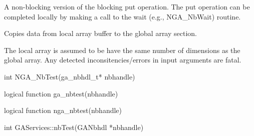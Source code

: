 \documentclass[12pt]{article}
\begin{document}
\ncoll

\begin{desc}
A non-blocking version of the blocking put operation. The put operation can be
completed locally by making a call to the wait (e.g., NGA_NbWait) routine.

Copies data from local array buffer to the global array section.

The local array is assumed to be have the same number of dimensions as the
global array. Any detected inconsitencies/errors in input arguments are fatal.
\end{desc}



\begin{capi}
\begin{ccode}
int NGA_NbTest(ga_nbhdl_t* nbhandle)
\end{ccode}
\begin{funcargs}
\end{funcargs}
\end{capi}

\begin{fapi}
\begin{fcode}
logical function ga_nbtest(nbhandle)
\end{fcode}
\begin{funcargs}
\end{funcargs}
\end{fapi}

\begin{fapi}
\begin{fcode}
logical function nga_nbtest(nbhandle)
\end{fcode}
\begin{funcargs}
\end{funcargs}
\end{fapi}

\begin{cxxapi}
\begin{cxxcode}
int GAServices::nbTest(GANbhdl *nbhandle)
\end{cxxcode}
\begin{funcargs}
\end{funcargs}
\end{cxxapi}
\end{document}
